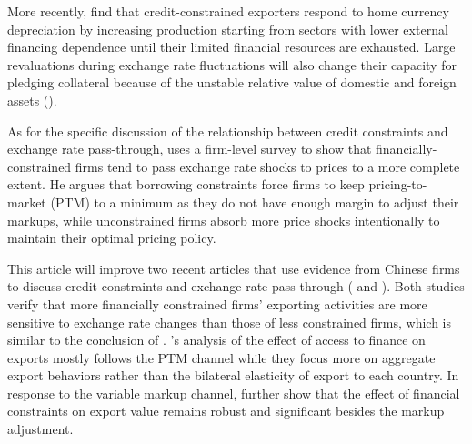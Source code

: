 More recently, \cite{li-lan-ouyang2020} find that credit-constrained exporters respond to home currency depreciation by increasing production starting from sectors with lower external financing dependence until their limited financial resources are exhausted. Large revaluations during exchange rate fluctuations will also change their capacity for pledging collateral because of the unstable relative value of domestic and foreign assets (\cite{kohn2020}). 

As for the specific discussion of the relationship between credit constraints and exchange rate pass-through, \cite{strasser2013} uses a firm-level survey to show that financially-constrained firms tend to pass exchange rate shocks to prices to a more complete extent. He argues that borrowing constraints force firms to keep pricing-to-market (PTM) to a minimum as they do not have enough margin to adjust their markups, while unconstrained firms absorb more price shocks intentionally to maintain their optimal pricing policy. 

This article will improve two recent articles that use evidence from Chinese firms to discuss credit constraints and exchange rate pass-through (\cite{dai2021} and \cite{xu-guo2021}). Both studies verify that more financially constrained firms' exporting activities are more sensitive to exchange rate changes than those of less constrained firms, which is similar to the conclusion of \cite{strasser2013}. \cite{dai2021}'s analysis of the effect of access to finance on exports mostly follows the PTM channel while they focus more on aggregate export behaviors rather than the bilateral elasticity of export to each country. In response to the variable markup channel, \cite{xu-guo2021} further show that the effect of financial constraints on export value remains robust and significant besides the markup adjustment. 

\newpage